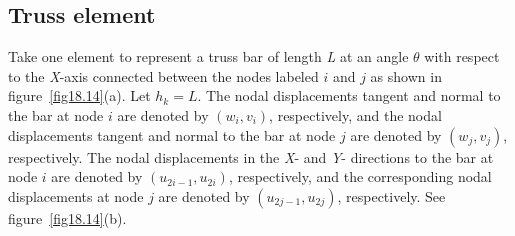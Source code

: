 \documentclass{AeroStructure-ERJohnson}
\begin{document}
\vspace*{-1.5pc}

{\def\thefigure{18.13}
}


\subsection{Truss element}\label{sec18.7.1}

Take one element to represent a truss bar of length \textit{L} at an angle $\theta$ with respect to the \textit{X}-axis connected between the nodes labeled $i$ and $j$ as shown in figure~\ref{fig18.14}(a). Let $h_{k}=L$. The nodal displacements tangent and normal to the bar at node $i$ are denoted by $\left(w_{i}, v_{i}\right)$, respectively, and the nodal displacements tangent and normal to the bar at node $j$ are denoted by $\left(w_{j}, v_{j}\right)$, respectively. The nodal displacements in the \textit{X}- and \textit{Y}- directions to the bar at node $i$ are denoted by $\left(u_{2 i-1}, u_{2 i}\right)$, respectively, and the corresponding nodal displacements at node $j$ are denoted by $\left(u_{2 j-1}, u_{2 j}\right)$, respectively. See figure~\ref{fig18.14}(b).

{\def\thefigure{18.14}
}
\end{document}
